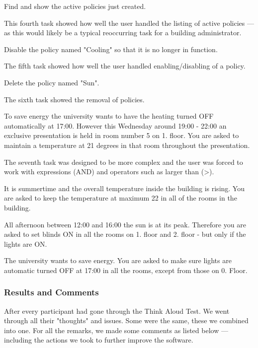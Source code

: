 \begin{framed}
Find and show the active policies just created.
\end{framed}
This fourth task showed how well the user handled the listing of active policies --- as this would likely be a typical reoccurring task for a building administrator.

\begin{framed}
Disable the policy named "Cooling" so that it is no longer in function.
\end{framed}
The fifth task showed how well the user handled enabling/disabling of a policy.

\begin{framed}
Delete the policy named "Sun".
\end{framed}
The sixth task showed the removal of policies.

\begin{framed}
To save energy the university wants to have the heating turned OFF automatically at 17:00. However this Wednesday around 19:00 - 22:00 an exclusive presentation is held in room number 5 on 1. floor.
You are asked to maintain a temperature at 21 degrees in that room throughout the presentation.
\end{framed}
The seventh task was designed to be more complex and the user was forced to work with expressions (AND) and operators such as larger than (\textgreater).

\begin{framed}
It is summertime and the overall temperature inside the building is rising. You are asked to keep the temperature at maximum 22 in all of the rooms in the building.
\end{framed}

\begin{framed}
All afternoon between 12:00 and 16:00 the sun is at its peak. Therefore you are asked to set blinds ON in all the rooms on 1. floor and 2. floor - but only if the lights are ON.
\end{framed}

\begin{framed}
The university wants to save energy. You are asked to make sure lights are automatic turned OFF at 17:00 in all the rooms, except from those on 0. Floor.
\end{framed}

\subsubsection{Results and Comments}
\label{results-and-comments}
After every participant had gone through the Think Aloud Test. We went through all their "thoughts" and issues. Some were the same, these we combined into one.
For all the remarks, we made some comments as listed below --- including the actions we took to further improve the software.

